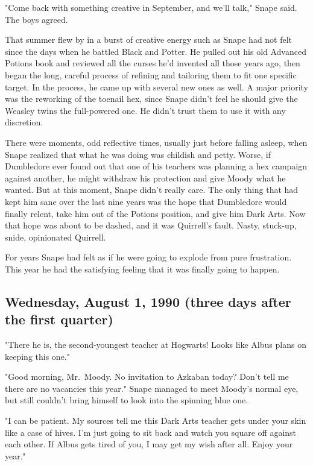 "Come back with something creative in September, and we'll talk," Snape said. The boys agreed.

That summer flew by in a burst of creative energy such as Snape had not felt since the days when he battled Black and Potter. He pulled out his old Advanced Potions book and reviewed all the curses he'd invented all those years ago, then began the long, careful process of refining and tailoring them to fit one specific target. In the process, he came up with several new ones as well. A major priority was the reworking of the toenail hex, since Snape didn't feel he should give the Weasley twins the full-powered one. He didn't trust them to use it with any discretion.

There were moments, odd reflective times, usually just before falling asleep, when Snape realized that what he was doing was childish and petty. Worse, if Dumbledore ever found out that one of his teachers was planning a hex campaign against another, he might withdraw his protection and give Moody what he wanted. But at this moment, Snape didn't really care. The only thing that had kept him sane over the last nine years was the hope that Dumbledore would finally relent, take him out of the Potions position, and give him Dark Arts. Now that hope was about to be dashed, and it was Quirrell's fault. Nasty, stuck-up, snide, opinionated Quirrell.

For years Snape had felt as if he were going to explode from pure frustration. This year he had the satisfying feeling that it was finally going to happen.

\subsection{Wednesday, August 1, 1990 (three days after the first quarter)}

"There he is, the second-youngest teacher at Hogwarts! Looks like Albus plans on keeping this one."

"Good morning, Mr.~Moody. No invitation to Azkaban today? Don't tell me there are no vacancies this year." Snape managed to meet Moody's normal eye, but still couldn't bring himself to look into the spinning blue one.

"I can be patient. My sources tell me this Dark Arts teacher gets under your skin like a case of hives. I'm just going to sit back and watch you square off against each other. If Albus gets tired of you, I may get my wish after all. Enjoy your year."

